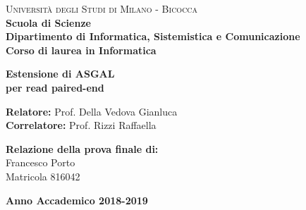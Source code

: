 \begin{titlepage}

        \noindent
        \begin{minipage}[t]{0.19\textwidth}
        \end{minipage}
        \begin{minipage}[t]{0.81\textwidth}
        {
                {\textsc{Università degli Studi di Milano - Bicocca}} \\
                \textbf{Scuola di Scienze} \\
                \textbf{Dipartimento di Informatica, Sistemistica e Comunicazione} \\
                \textbf{Corso di laurea in Informatica} \\
                \par
        }
        \end{minipage}

	\vspace{40mm}

	\begin{center}
            {\LARGE{
                    \textbf{Estensione di ASGAL \\ per read paired-end}
                    \par
            }}
        \end{center}

        \vspace{50mm}

        \noindent
        {\large \textbf{Relatore:} Prof. Della Vedova Gianluca } \\

        \noindent
        {\large \textbf{Correlatore:} Prof. Rizzi Raffaella}

        \vspace{15mm}

        \begin{flushright}
            {\large \textbf{Relazione della prova finale di:}} \\
            \large{Francesco Porto} \\
            \large{Matricola 816042}
        \end{flushright}

        \vspace{40mm}
        \begin{center}
            {\large{\bf Anno Accademico 2018-2019}}
        \end{center}

        \restoregeometry

    \end{titlepage}
